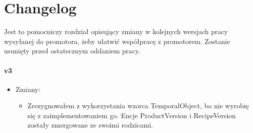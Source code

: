 \chapter*{Changelog}\label{ch:changelog}

Jest to pomocniczy rozdział opisujący zmiany w kolejnych wersjach pracy wysyłanej do promotora, żeby ułatwić współpracę z promotorem.
Zostanie usunięty przed ostatecznym oddaniem pracy.

\subsubsection{v3}
\begin{itemize}
\item Zmiany:
    \begin{itemize}
    \item Zrezygnowałem z wykorzystania wzorca TemporalObject, bo nie wyrobię się z zaimplementowaniem go. Encje ProductVersion i RecipeVersion zostały zmergowane ze swoimi rodzicami.
	\end{itemize}
\end{itemize}

